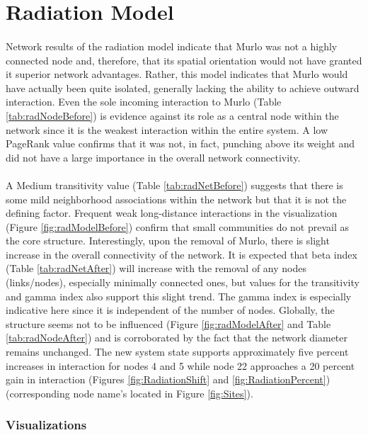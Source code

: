 \documentclass[12pt,a4paper]{thesis}
\begin{document}
\section{Radiation Model} 

\paragraph{}
Network results of the radiation model indicate that Murlo was not a highly connected node and, therefore,  that its spatial orientation would not have granted it superior network advantages. Rather, this model indicates that Murlo would have actually been quite isolated, generally lacking the ability to achieve outward interaction. Even the sole incoming interaction to Murlo (Table \ref{tab:radNodeBefore}) is evidence against its role as a central node within the network since it is the weakest interaction within the entire system. A low PageRank value confirms that it was not, in fact, punching above its weight and did not have a large importance in the overall network connectivity. 

\paragraph{}
A Medium transitivity value (Table \ref{tab:radNetBefore}) suggests that there is some mild neighborhood associations within the network but that it is not the defining factor. Frequent weak long-distance interactions in the visualization (Figure \ref{fig:radModelBefore}) confirm that small communities do not prevail as the core structure. Interestingly, upon the removal of Murlo, there is slight increase in the overall connectivity of the network. It is expected that beta index (Table \ref{tab:radNetAfter}) will increase with the removal of any nodes (links/nodes), especially minimally connected ones, but values for the transitivity and gamma index also support this slight trend. The gamma index is especially indicative here since it is independent of the number of nodes. Globally, the structure seems not to be influenced (Figure \ref{fig:radModelAfter} and Table \ref{tab:radNodeAfter}) and is corroborated by the fact that the network diameter remains unchanged. The new system state supports approximately five percent increases in interaction for nodes 4 and 5 while node 22 approaches a 20 percent gain in interaction (Figures \ref{fig:RadiationShift} and \ref{fig:RadiationPercent}) (corresponding node name's located in Figure \ref{fig:Sites}). 
\subsubsection{Visualizations}
\end{document}
